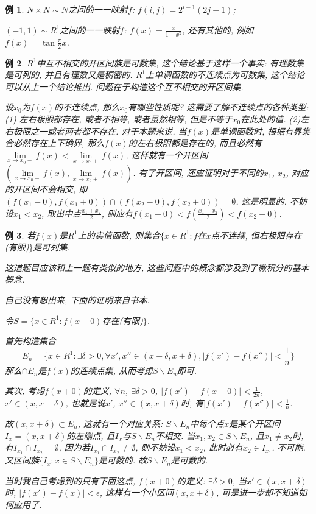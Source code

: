 \documentclass[12pt,a4paper,openany]{book}
\newtheorem{example}{例}
\begin{document}
\begin{example}
$N \times N \sim N$之间的一一映射$f$: $f(i, j) = 2^{i-1}(2j-1)$;

$(-1, 1) \sim R^1$之间的一一映射$f$: $f(x) = \frac{x}{1 - x^2}$, 还有其他的, 例如$f(x) = \tan{\frac{\pi}{2}x}$.
\end{example}

\begin{example}
$R^1$中互不相交的开区间族是可数集, 这个结论基于这样一个事实: 有理数集是可列的, 并且有理数又是稠密的. $R^1$上单调函数的不连续点为可数集, 这个结论可以从上一个结论推出. 问题在于构造这个互不相交的开区间集.

设$x_0$为$f(x)$的不连续点, 那么$x_0$有哪些性质呢? 这需要了解不连续点的各种类型: (1) 左右极限都存在, 或者不相等, 或者虽然相等, 但是不等于$x_0$在此处的值.  (2)左右极限之一或者两者都不存在. 对于本题来说, 当$f(x)$是单调函数时, 根据有界集合必然存在上下确界, 那么$f(x)$的左右极限都是存在的, 而且必然有$\lim\limits_{x \rightarrow x_0-}{f(x)} < \lim\limits_{x \rightarrow x_0+}{f(x)}$, 这样就有一个开区间$(\lim\limits_{x \rightarrow x_0-}{f(x)}, \lim\limits_{x \rightarrow x_0+}{f(x)})$. 有了开区间, 还应证明对于不同的$x_1$, $x_2$, 对应的开区间不会相交, 即$(f(x_1-0), f(x_1+0)) \cap (f(x_2-0), f(x_2+0)) = \emptyset$, 这是明显的. 不妨设$x_1 < x_2$, 取出中点$\frac{x_1 + x_2}{2}$, 则应有$f(x_1 + 0) < f(\frac{x_1 + x_2}{2}) < f(x_2-0)$.
\end{example}

\begin{example}
若$f(x)$是$R^1$上的实值函数, 则集合$\{x \in R^1: f$在$x$点不连续, 但右极限存在(有限)$\}$是可列集.

这道题目应该和上一题有类似的地方, 这些问题中的概念都涉及到了微积分的基本概念.

自己没有想出来, 下面的证明来自书本.

令$S = \{x \in R^1: f(x+0)$存在(有限)$\}$.

首先构造集合
$$E_n = \{x \in R^1: \exists \delta > 0, \forall x', x'' \in (x - \delta, x + \delta), |f(x') - f(x'')| < \frac{1}{n} \}$$
那么$\cap{E_n}$是$f(x)$的连续点集, 从而考虑$S \backslash E_n$即可.

其次, 考虑$f(x+0)$的定义, $\forall n$, $\exists \delta > 0$, $|f(x') - f(x+0)| < \frac{1}{2n}$, $x' \in (x, x + \delta)$, 也就是说$x'$, $x'' \in (x, x+ \delta)$时, 有$|f(x') - f(x'')| < \frac{1}{n}$.

故$(x, x  + \delta) \subset E_n$, 这就有一个对应关系: $S \backslash E_n$中每个点$x$是某个开区间$I_x = (x, x + \delta)$的左端点, 且$I_x$与$S \backslash E_n$不相交. 当$x_1, x_2 \in S \backslash E_n$, 且$x_1 \neq x_2$时, 有$I_{x_1} \cap I_{x_2} = \emptyset$, 因为若$I_{x_1} \cap I_{x_2} \neq \emptyset$, 则不妨设$x_1 < x_2$, 此时必有$x_2 \in I_{x_1}$, 不可能. 又区间族$\{I_x : x \in S \backslash E_n\}$是可数的. 故$S \backslash E_n$是可数的.

当时我自己考虑到的只有下面这点, $f(x+0)$的定义: $\exists \delta > 0$, 当$x' \in (x, x + \delta)$时, $|f(x') - f(x)| < \epsilon$, 这样有一个小区间$(x, x + \delta)$, 可是进一步却不知道如何应用了.
\end{example}
\end{document}

